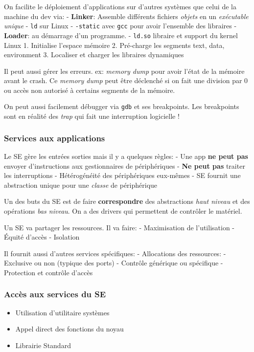 On facilite le déploiement d'applications sur d'autres systèmes que
celui de la machine du dev via: - \textbf{Linker}: Assemble différents
fichiers \emph{objets} en un \emph{exécutable unique} - \texttt{ld} sur
Linux - \texttt{-static} avec \texttt{gcc} pour avoir l'ensemble des
libraires - \textbf{Loader}: au démarrage d'un programme. -
\texttt{ld.so} libraire et support du kernel Linux 1. Initialise
l'espace mémoire 2. Pré-charge les segments text, data, environment 3.
Localiser et charger les libraires dynamiques

Il peut aussi gérer les erreurs. ex: \emph{memory dump} pour avoir
l'état de la mémoire avant le crash. Ce \emph{memory dump} peut être
déclenché si on fait une division par 0 ou accès non autorisé à certains
segments de la mémoire.

On peut aussi facilement débugger via \texttt{gdb} et ses breakpoints.
Les breakpoints sont en réalité des \emph{trap} qui fait une
interruption logicielle !

\subsubsection{Services aux
applications}\label{services-aux-applications}

Le SE gère les entrées sorties mais il y a quelques règles: - Une app
\textbf{ne peut pas} envoyer d'instructions aux gestionnaires de
périphériques - \textbf{Ne peut pas} traiter les interruptions -
Hétérogénéité des périphériques eux-mêmes - SE fournit une abstraction
unique pour une \emph{classe} de périphérique

Un des buts du SE est de faire \textbf{correspondre} des abstractions
\emph{haut niveau} et des opérations \emph{bas niveau}. On a des drivers
qui permettent de contrôler le matériel.

Un SE va partager les ressources. Il va faire: - Maximisation de
l'utilisation - Équité d'accès - Isolation

Il fournit aussi d'autres services spécifiques: - Allocations des
ressources: - Exclusive ou non (typique des ports) - Contrôle générique
ou spécifique - Protection et contrôle d'accès

\subsubsection{Accès aux services du
SE}\label{accuxe8s-aux-services-du-se}

\begin{itemize}
\tightlist
\item
  Utilisation d'utilitaire systèmes
\item
  Appel direct des fonctions du noyau
\item
  Librairie Standard
\end{itemize}

